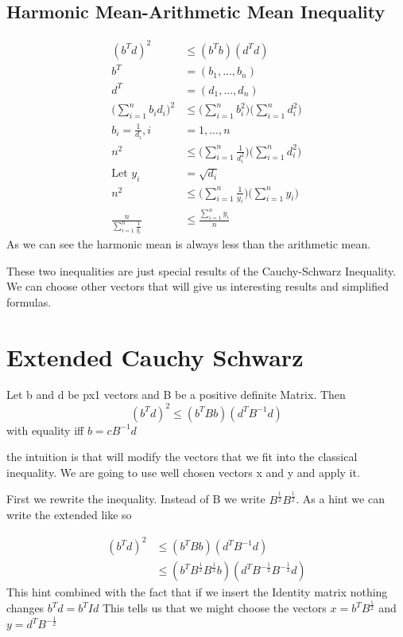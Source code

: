 \subsection{Harmonic Mean-Arithmetic Mean Inequality}
\begin{align*}
(b^Td)^2 &\leq(b^Tb)(d^Td)\\
b^T &= (b_1,...,b_n)\\
    d^T &= (d_1,...,d_n)\\
    \Big(\displaystyle\sum_{i=1}^{n}b_id_i\Big)^2 &\leq \Big(\displaystyle\sum_{i=1}^n b_i^2\Big)\Big(\displaystyle\sum_{i=1}^n d_i^2\Big)\\
    b_i =\frac{1}{d_i}, i &=1,...,n \\
    n^2 &\leq \Big(\displaystyle\sum_{i=1}^n \frac{1}{d_i^2}\Big)\Big(\displaystyle\sum_{i=1}^n d_i^2\Big)\\
    \text{Let }y_i &= \sqrt{d_i}\\
    n^2 &\leq \Big(\displaystyle\sum_{i=1}^n \frac{1}{y_i}\Big)\Big(\displaystyle\sum_{i=1}^n y_i\Big)\\
    \frac{n}{\displaystyle\sum_{i=1}^n \frac{1}{y_i}} &\leq \frac{\displaystyle\sum_{i=1}^n y_i}{n}
\end{align*}
As we can see the harmonic mean is always less than the arithmetic mean. 

These two inequalities are just special results of the Cauchy-Schwarz Inequality. We can choose other vectors that will give us interesting results and simplified formulas.

\section{Extended Cauchy Schwarz}
Let b and d be px1 vectors and B be a positive definite Matrix. Then
\[(b^Td)^2 \leq (b^TBb)(d^TB^{-1}d)\]
with equality iff \(b=cB^{-1}d\)

the intuition is that will modify the vectors that we fit into the classical inequality. We are going to use well chosen vectors x and y and apply it.

First we rewrite the inequality. Instead of B we write $B^{\frac{1}{2}}B^{\frac{1}{2}}$. As a hint we can write the extended like so

\begin{align*}
(b^Td)^2 &\leq (b^TBb)(d^TB^{-1}d)\\
&\leq (b^TB^\frac{1}{2}B^\frac{1}{2} b)(d^TB^{-\frac{1}{2}}B^{-\frac{1}{2}}d)
\end{align*}
This hint combined with the fact that if we insert the Identity matrix nothing changes $b^T d=b^T I d$ 
This tells us that we might choose the vectors
$x=b^T B^{\frac{1}{2}}$ and $y=d^T B^{-\frac{1}{2}}$


